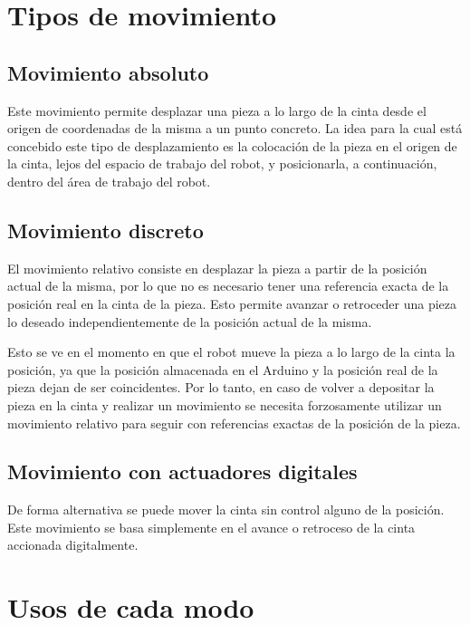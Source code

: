 \section{Tipos de movimiento}

\subsection{Movimiento absoluto}

Este movimiento permite desplazar una pieza a lo largo de la cinta desde el origen de coordenadas de la misma a un punto concreto. La idea para la cual está concebido este tipo de desplazamiento es la colocación de la pieza en el origen de la cinta, lejos del espacio de trabajo del robot, y posicionarla, a continuación, dentro del área de trabajo del robot.

\subsection{Movimiento discreto}

El movimiento relativo consiste en desplazar la pieza a partir de la posición actual de la misma, por lo que no es necesario tener una referencia exacta de la posición real en la cinta de la pieza. Esto permite avanzar o retroceder una pieza lo deseado independientemente de la posición actual de la misma.

Esto se ve en el momento en que el robot mueve la pieza a lo largo de la cinta la posición, ya que la posición almacenada en el Arduino y la posición real de la pieza dejan de ser coincidentes. Por lo tanto, en caso de volver a depositar la pieza en la cinta y realizar un movimiento se necesita forzosamente utilizar un movimiento relativo para seguir con referencias exactas de la posición de la pieza.

\subsection{Movimiento con actuadores digitales}

De forma alternativa se puede mover la cinta sin control alguno de la posición. Este movimiento se basa simplemente en el avance o retroceso de la cinta accionada digitalmente.

\section{Usos de cada modo}




